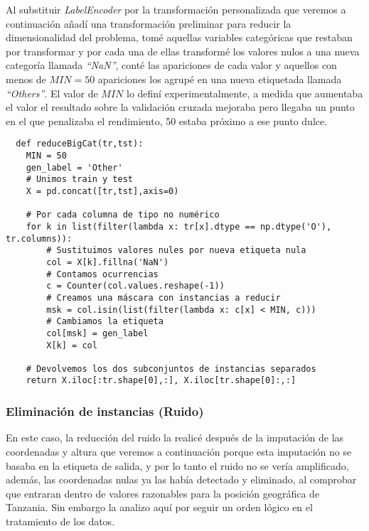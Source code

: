 \documentclass{article}
\begin{document}
Al substituir \textit{LabelEncoder} por la transformación personalizada que veremos a continuación añadí una transformación preliminar para reducir la dimensionalidad del problema, tomé aquellas variables categóricas que restaban por transformar y por cada una de ellas transformé los valores nulos a una nueva categoría llamada \textit{``NaN''}, conté las apariciones de cada valor y aquellos con menos de $MIN=50$ apariciones los agrupé en una nueva etiquetada llamada \textit{``Others''}. El valor de $MIN$ lo definí experimentalmente, a medida que aumentaba el valor el resultado sobre la validación cruzada mejoraba pero llegaba un punto en el que penalizaba el rendimiento, 50 estaba próximo a ese punto dulce.

\begin{verbatim}
  def reduceBigCat(tr,tst):
    MIN = 50
    gen_label = 'Other'
    # Unimos train y test
    X = pd.concat([tr,tst],axis=0)
    
    # Por cada columna de tipo no numérico
    for k in list(filter(lambda x: tr[x].dtype == np.dtype('O'), tr.columns)):
        # Sustituimos valores nules por nueva etiqueta nula
        col = X[k].fillna('NaN')
        # Contamos ocurrencias
        c = Counter(col.values.reshape(-1))
        # Creamos una máscara con instancias a reducir
        msk = col.isin(list(filter(lambda x: c[x] < MIN, c)))
        # Cambiamos la etiqueta
        col[msk] = gen_label
        X[k] = col
    
    # Devolvemos los dos subconjuntos de instancias separados
    return X.iloc[:tr.shape[0],:], X.iloc[tr.shape[0]:,:]
\end{verbatim}

\subsubsection{Eliminación de instancias (Ruido)}

En este caso, la reducción del ruido la realicé después de la imputación de las coordenadas y altura que veremos a continuación porque esta imputación no se basaba en la etiqueta de salida, y por lo tanto el ruido no se vería amplificado, además, las coordenadas nulas ya las había detectado y eliminado, al comprobar que entraran dentro de valores razonables para la posición geográfica de Tanzania. Sin embargo la analizo aquí por seguir un orden lógico en el tratamiento de los datos. 
\end{document}
